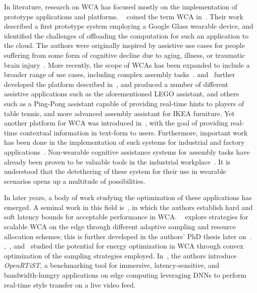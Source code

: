 \medskip
In literature, research on \gls{WCA} has focused mostly on the implementation of prototype applications and platforms.
\citeauthor{ha2014towards}~\cite{ha2014towards} coined the term \acl{WCA} in\ \citeyear{ha2014towards}.
Their work described a first prototype system employing a Google Glass wearable device, and identified the challenges of offloading the computation for such an application to the cloud.
The authors were originally inspired by assistive use cases for people suffering from some form of cognitive decline due to aging, illness, or traumatic brain injury~\cite{ha2014towards,satyanarayanan2019augmenting}.
More recently, the scope of \glspl{WCA} has been expanded to include a broader range of use cases, including complex assembly tasks~\cite{chen2017empirical,chen2018application,wang2020scaling,wang2019towards}.
\cite{chen2015early} and~\cite{chen2018application} further developed the platform described in~\cite{ha2014towards}, and produced a number of different assistive applications such as the aforementioned LEGO assistant, and others such as a Ping-Pong assistant capable of providing real-time hints to players of table tennis, and more advanced assembly assistant for IKEA furniture.
Yet another platform for \gls{WCA} was introduced in~\cite{chatzopoulos2017hyperion}, with the goal of providing real-time contextual information in text-form to users.
Furthermore, important work has been done in the implementation of such systems for industrial and factory applications~\cite{belletier2021wearable}.
Non-wearable cognitive assistance systems for assembly tasks have already been proven to be valuable tools in the industrial workplace~\cite{funk2015cognitive,gorecky2011cognito}.
It is understood that the detethering of these system for their use in wearable scenarios opens up a multitude of possibilities.

In later years, a body of work studying the optimization of these applications has emerged.
A seminal work in this field is~\cite{chen2017empirical}, in which the authors establish hard and soft latency bounds for acceptable performance in \gls{WCA}.
\citeauthor{wang2019towards}~\cite{wang2019towards} explore strategies for scalable \gls{WCA} on the edge through different adaptive sampling and resource allocation schemes;
this is further developed in the authors' PhD thesis later on~\cite{wang2020scaling}.
\cite{moothedath2021energy},\ \cite{moothedath2022energy1}, and~\cite{moothedath2022energy2} studied the potential for energy optimization in \gls{WCA} through convex optimization of the sampling strategies employed.
In~\cite{george2020openrtist}, the authors introduce \emph{OpenRTiST}, a benchmarking tool for immersive, latency-sensitive, and bandwidth-hungry applications on edge computing leveraging \glspl{DNN} to perform real-time style transfer on a live video feed.


